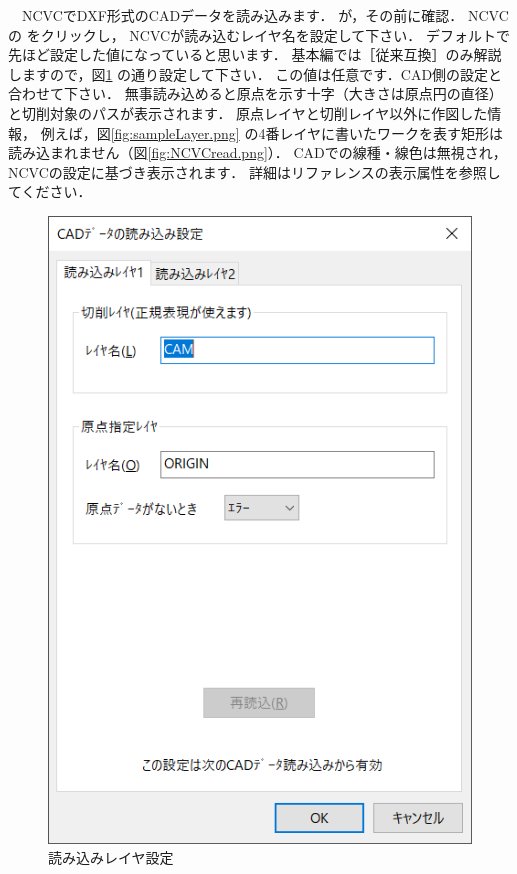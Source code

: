 \begin{minipage}[t]{0.5\textwidth}
　NCVCでDXF形式のCADデータを読み込みます．
が，その前に確認．
NCVCの  をクリックし，
NCVCが読み込むレイヤ名を設定して下さい．
デフォルトで先ほど設定した値になっていると思います．
基本編では［従来互換］のみ解説しますので，図\ref{fig:NCVCsetup.png} の通り設定して下さい．
この値は任意です．CAD側の設定と合わせて下さい．
無事読み込めると原点を示す十字（大きさは原点円の直径）と切削対象のパスが表示されます．
原点レイヤと切削レイヤ以外に作図した情報，
例えば，図\ref{fig:sampleLayer.png} の4番レイヤに書いたワークを表す矩形は読み込まれません（図\ref{fig:NCVCread.png}）．
CADでの線種・線色は無視され，NCVCの設定に基づき表示されます．
詳細はリファレンスの表示属性を参照してください．
\end{minipage}
\begin{minipage}[t]{0.5\textwidth}
\vspace*{-2zh}
\begin{figure}[H]
\centering
\includegraphics[scale=0.8]{No1/fig/NCVCsetup.png}
\caption{読み込みレイヤ設定}
\label{fig:NCVCsetup.png}
\end{figure}
\end{minipage}

